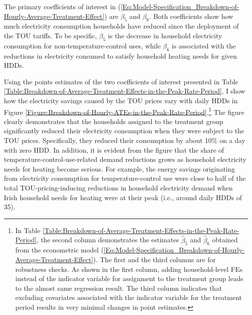 The primary coefficients of interest in (\ref{Eq:Model-Specification_Breakdown-of-Hourly-Average-Treatment-Effect}) are $\beta_{5}$ and $\beta_{6}$. Both coefficients show how much electricity consumption households have reduced since the deployment of the TOU tariffs. To be specific, $\beta_{5}$ is the decrease in household electricity consumption for non-temperature-control uses, while $\beta_{6}$ is associated with the reductions in electricity consumed to satisfy household heating needs for given HDDs. 

Using the points estimates of the two coefficients of interest presented in Table \ref{Table:Breakdown-of-Average-Treatment-Effects-in-the-Peak-Rate-Period}, I show how the electricity savings caused by the TOU prices vary with daily HDDs in Figure \ref{Figure:Breakdown-of-Hourly-ATEs-in-the-Peak-Rate-Period}.\footnote{In Table \ref{Table:Breakdown-of-Average-Treatment-Effects-in-the-Peak-Rate-Period}, the second column demonstrates the estimates $\hat{\beta}_{5}$ and $\hat{\beta}_{6}$ obtained from the econometric model (\ref{Eq:Model-Specification_Breakdown-of-Hourly-Average-Treatment-Effect}). The first and the third columns are for robustness checks. As shown in the first column, adding household-level FEs instead of the indicator variable for assignment to the treatment group leads to the almost same regression result. The third column indicates that excluding covariates associated with the indicator variable for the treatment period results in very minimal changes in point estimates.} The figure clearly demonstrates that the households assigned to the treatment group significantly reduced their electricity consumption when they were subject to the TOU prices. Specifically, they reduced their consumption by about 10\% on a day with zero HDD. In addition, it is evident from the figure that the share of temperature-control-use-related demand reductions grows as household electricity needs for heating become serious. For example, the energy savings originating from electricity consumption for temperature-control use were close to half of the total TOU-pricing-inducing reductions in household electricity demand when Irish household needs for heating were at their peak (i.e., around daily HDDs of 35).  

